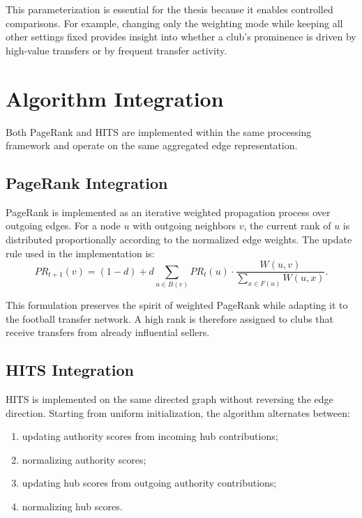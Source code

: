 This parameterization is essential for the thesis because it enables controlled comparisons. For example, changing only the weighting mode while keeping all other settings fixed provides insight into whether a club's prominence is driven by high-value transfers or by frequent transfer activity.


\section{Algorithm Integration}
\label{sec:integration}

Both PageRank and HITS are implemented within the same processing framework and operate on the same aggregated edge representation.

\subsection{PageRank Integration}
\label{subsec:pagerank_integration}

PageRank is implemented as an iterative weighted propagation process over outgoing edges. For a node $u$ with outgoing neighbors $v$, the current rank of $u$ is distributed proportionally according to the normalized edge weights. The update rule used in the implementation is:
\[
PR_{t+1}(v) = (1-d) + d \sum_{u \in B(v)} PR_t(u) \cdot \frac{W(u,v)}{\sum_{x \in F(u)} W(u,x)}.
\]

This formulation preserves the spirit of weighted PageRank while adapting it to the football transfer network. A high rank is therefore assigned to clubs that receive transfers from already influential sellers.

\subsection{HITS Integration}
\label{subsec:hits_integration}

HITS is implemented on the same directed graph without reversing the edge direction. Starting from uniform initialization, the algorithm alternates between:
\begin{enumerate}
    \item updating authority scores from incoming hub contributions;
    \item normalizing authority scores;
    \item updating hub scores from outgoing authority contributions;
    \item normalizing hub scores.
\end{enumerate}

